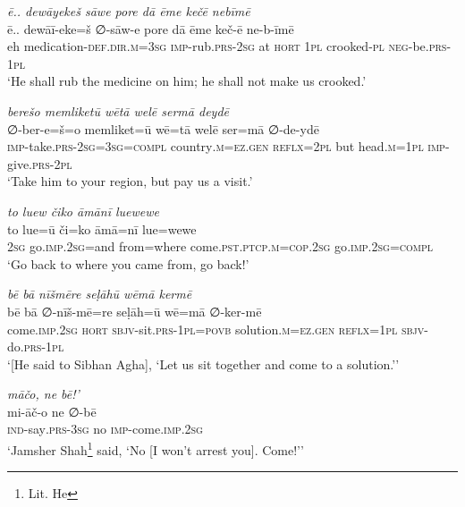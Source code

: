 \ea \label{DG.66}
\textit{ē.. dewāyekeš sāwe pore dā ēme kečē nebīmē} \\ 
\gll ē.. dewāī-eke=š ∅-sāw-e pore dā ēme keč-ē ne-b-īmē \\ 
 eh medication\textsc{-def}\textsc{.dir}\textsc{.m}\textsc{=3sg} \textsc{imp-}rub\textsc{.prs}-\textsc{2sg} at \textsc{hort} \textsc{1pl} crooked\textsc{\textsc{-pl}} \textsc{neg-}be\textsc{.prs}-\textsc{1pl} \\ 
\glt `He shall rub the medicine on him; he shall not make us crooked.'
\z 
 
\ea \label{DG.68}
\textit{berešo memliketū wētā welē sermā deydē} \\ 
\gll ∅-ber-e=š=o memliket=ū wē=tā welē ser=mā ∅-de-ydē \\ 
 \textsc{imp-}take\textsc{.prs}-\textsc{2sg}\textsc{=3sg}\textsc{=\textsc{compl}} country\textsc{.m}\textsc{=ez}\textsc{.gen} \textsc{reflx}\textsc{=2pl} but head\textsc{.m}\textsc{=1pl} \textsc{imp-}give\textsc{.prs}\textsc{-2pl} \\ 
\glt `Take him to your region, but pay us a visit.'
\z 
 
\ea \label{DP.24}
\textit{to luew čiko āmānī luewewe} \\ 
\gll to lue=ū či=ko āmā=nī lue=wewe \\ 
 \textsc{2sg} go\textsc{.imp}\textsc{.\textsc{2sg}}=and from=where come\textsc{.pst}\textsc{.ptcp}\textsc{.m}\textsc{=cop}\textsc{.\textsc{2sg}} go\textsc{.imp}\textsc{.\textsc{2sg}}\textsc{=compl} \\ 
\glt `Go back to where you came from, go back!'
\z 
 
\ea \label{DP.39}
\textit{bē bā nīšmēre seḷāhū wēmā kermē} \\ 
\gll bē bā ∅-nīš-mē=re seḷāh=ū wē=mā ∅-ker-mē \\ 
 come\textsc{.imp}\textsc{.\textsc{2sg}} \textsc{hort} \textsc{sbjv-}sit\textsc{.prs}\textsc{-1pl}\textsc{=\textsc{povb}} solution\textsc{.m}\textsc{=ez}\textsc{.gen} \textsc{reflx}\textsc{=1pl} \textsc{sbjv-}do\textsc{.prs}\textsc{-1pl} \\ 
\glt `[He said to Sibhan Agha], ‘Let us sit together and come to a solution.’'
\z 
 
\ea \label{DP.42}
\textit{māčo, ne bē!’} \\ 
\gll mi-āč-o ne ∅-bē \\ 
 \textsc{ind-}say\textsc{.prs}\textsc{-3sg} no \textsc{imp-}come\textsc{.imp}\textsc{.\textsc{2sg}} \\ 
\glt `Jamsher Shah\footnote{Lit. He} said, ‘No [I won’t arrest you]. Come!’'
\z 
 
